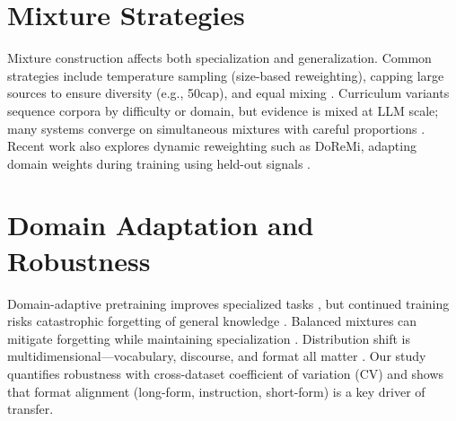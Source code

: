 \section{Mixture Strategies}
Mixture construction affects both specialization and generalization. Common strategies include temperature sampling (size-based reweighting), capping large sources to ensure diversity (e.g., 50cap), and equal mixing \parencite{arivazhagan2019massively,longpre2023pretrainer,sanh2022multitask}. Curriculum variants sequence corpora by difficulty or domain, but evidence is mixed at LLM scale; many systems converge on simultaneous mixtures with careful proportions \parencite{raffel2020exploring,longpre2023pretrainer}. Recent work also explores dynamic reweighting such as DoReMi, adapting domain weights during training using held-out signals \parencite{xie2023doremi}.

\section{Domain Adaptation and Robustness}
Domain-adaptive pretraining improves specialized tasks \parencite{gururangan2020don}, but continued training risks catastrophic forgetting of general knowledge \parencite{mccloskey1989catastrophic,french1999catastrophic,kirkpatrick2017overcoming}. Balanced mixtures can mitigate forgetting while maintaining specialization \parencite{raffel2020exploring,arivazhagan2019massively}. Distribution shift is multidimensional—vocabulary, discourse, and format all matter \parencite{quinonero2009dataset,aharoni2020unsupervised}. Our study quantifies robustness with cross-dataset coefficient of variation (CV) and shows that format alignment (long-form, instruction, short-form) is a key driver of transfer.
